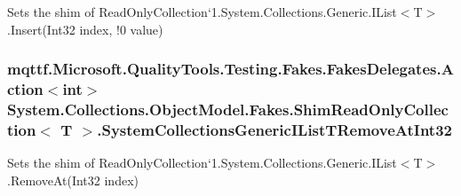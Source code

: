 Sets the shim of Read\-Only\-Collection`1.System.\-Collections.\-Generic.\-I\-List$<$T$>$.Insert(Int32 index, !0 value)

\hypertarget{class_system_1_1_collections_1_1_object_model_1_1_fakes_1_1_shim_read_only_collection_3_01_t_01_4_a3c787eaf1b7a8077a58914e7b9fc45c6}{
\subsubsection[{System\-Collections\-Generic\-I\-List\-T\-Remove\-At\-Int32}]{\setlength{\rightskip}{0pt plus 5cm}mqttf.\-Microsoft.\-Quality\-Tools.\-Testing.\-Fakes.\-Fakes\-Delegates.\-Action$<$int$>$ System.\-Collections.\-Object\-Model.\-Fakes.\-Shim\-Read\-Only\-Collection$<$ T $>$.System\-Collections\-Generic\-I\-List\-T\-Remove\-At\-Int32\hspace{0.3cm}{\ttfamily [set]}}}\label{class_system_1_1_collections_1_1_object_model_1_1_fakes_1_1_shim_read_only_collection_3_01_t_01_4_a3c787eaf1b7a8077a58914e7b9fc45c6}


Sets the shim of Read\-Only\-Collection`1.System.\-Collections.\-Generic.\-I\-List$<$T$>$.Remove\-At(\-Int32 index)

